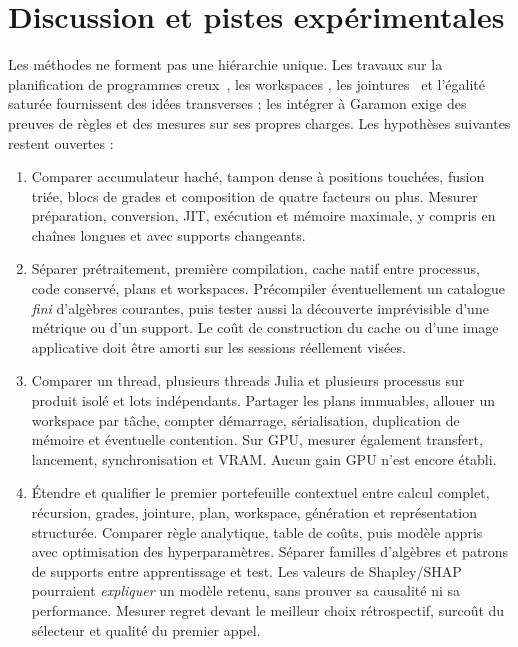 \documentclass[11pt,a4paper]{article}
\begin{document}
\section{Discussion et pistes expérimentales}
Les méthodes ne forment pas une hiérarchie unique. Les travaux sur la
planification de programmes creux~\cite{galley}, les workspaces
\cite{sparseworkspace}, les jointures~\cite{leapfrog} et l'égalité saturée
\cite{egg} fournissent des idées transverses ; les intégrer à Garamon exige
des preuves de règles et des mesures sur ses propres charges. Les hypothèses
suivantes restent ouvertes :
\begin{enumerate}
\item Comparer accumulateur haché, tampon dense à positions touchées, fusion
triée, blocs de grades et composition de quatre facteurs ou plus. Mesurer
préparation, conversion, JIT, exécution et mémoire maximale, y compris en
chaînes longues et avec supports changeants.
\item Séparer prétraitement, première compilation, cache natif entre processus,
code conservé, plans et workspaces. Précompiler éventuellement un catalogue
\emph{fini} d'algèbres courantes, puis tester aussi la découverte imprévisible
d'une métrique ou d'un support. Le coût de construction du cache ou d'une image
applicative doit être amorti sur les sessions réellement visées.
\item Comparer un thread, plusieurs threads Julia et plusieurs processus sur
produit isolé et lots indépendants. Partager les plans immuables, allouer un
workspace par tâche, compter démarrage, sérialisation, duplication de mémoire
et éventuelle contention. Sur GPU, mesurer également transfert, lancement,
synchronisation et VRAM. Aucun gain GPU n'est encore établi.
\item Étendre et qualifier le premier portefeuille contextuel entre calcul
complet, récursion,
grades, jointure, plan, workspace, génération et représentation structurée.
Comparer règle analytique, table de coûts, puis modèle appris avec optimisation
des hyperparamètres. Séparer familles d'algèbres et patrons de supports entre
apprentissage et test. Les valeurs de Shapley/SHAP~\cite{shap} pourraient
\emph{expliquer} un modèle retenu, sans prouver sa causalité ni sa performance.
Mesurer regret devant le meilleur choix rétrospectif, surcoût du sélecteur et
qualité du premier appel.
\end{enumerate}
\end{document}
